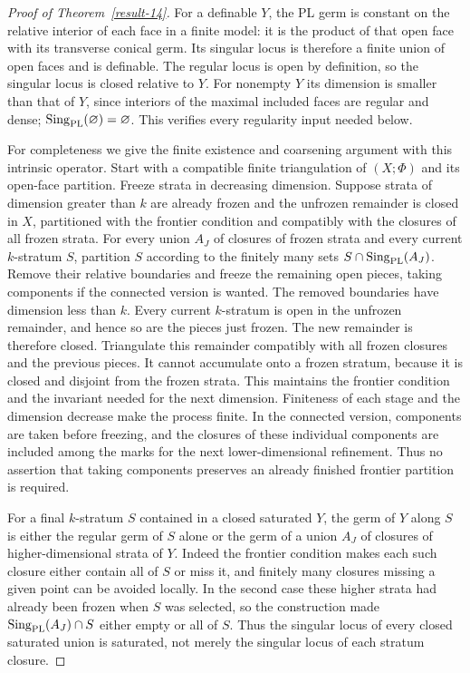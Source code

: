 \documentclass[11pt,a4paper]{article}
\theoremstyle{definition}
\begin{document}
\begin{proof}[Proof of Theorem~\ref{result-14}]
For a definable $Y$, the PL germ is constant on the relative
interior of each face in a finite model: it is the product of
that open face with its transverse conical germ. Its singular
locus is therefore a finite union of open faces and is definable.
The regular locus is open by definition, so the singular locus
is closed relative to $Y$. For nonempty $Y$ its dimension is smaller
than that of $Y$, since interiors of the maximal included faces are
regular and dense; $\operatorname{Sing}_{\rm PL}(\varnothing)
=\varnothing$. This verifies every regularity input needed below.

For completeness we give the finite existence and coarsening
argument with this intrinsic operator. Start with a compatible
finite triangulation of $(X;\Phi)$ and its open-face partition.
Freeze strata in decreasing dimension. Suppose strata of dimension
greater than $k$ are already frozen and the unfrozen remainder
is closed in $X$, partitioned with the frontier condition and
compatibly with the closures of all frozen strata. For every union
$A_J$ of closures of frozen strata and every current $k$-stratum
$S$, partition $S$ according to the finitely many sets
$S\cap\operatorname{Sing}_{\rm PL}(A_J)$. Remove their relative
boundaries and freeze the remaining open pieces, taking components
if the connected version is wanted. The removed boundaries have
dimension less than $k$. Every current $k$-stratum is open in the
unfrozen remainder, and hence so are the pieces just frozen. The
new remainder is therefore closed. Triangulate this remainder
compatibly with all frozen closures and the previous pieces. It
cannot accumulate onto a frozen stratum, because it is closed and
disjoint from the frozen strata. This maintains the frontier
condition and the invariant needed for the next dimension. Finiteness
of each stage and the dimension decrease make the process finite.
In the connected version, components are taken before freezing,
and the closures of these individual components are included
among the marks for the next lower-dimensional refinement.
Thus no assertion that taking components preserves an already
finished frontier partition is required.

For a final $k$-stratum $S$ contained in a closed saturated $Y$,
the germ of $Y$ along $S$ is either the regular germ of $S$ alone
or the germ of a union $A_J$ of closures of higher-dimensional
strata of $Y$. Indeed the frontier condition makes each such
closure either contain all of $S$ or miss it, and finitely many
closures missing a given point can be avoided locally. In the
second case these higher strata had already been frozen when $S$
was selected, so the construction made
$\operatorname{Sing}_{\rm PL}(A_J)\cap S$ either empty or all of
$S$. Thus the singular locus of every closed saturated union is
saturated, not merely the singular locus of each stratum closure.


\end{proof}
\end{document}
